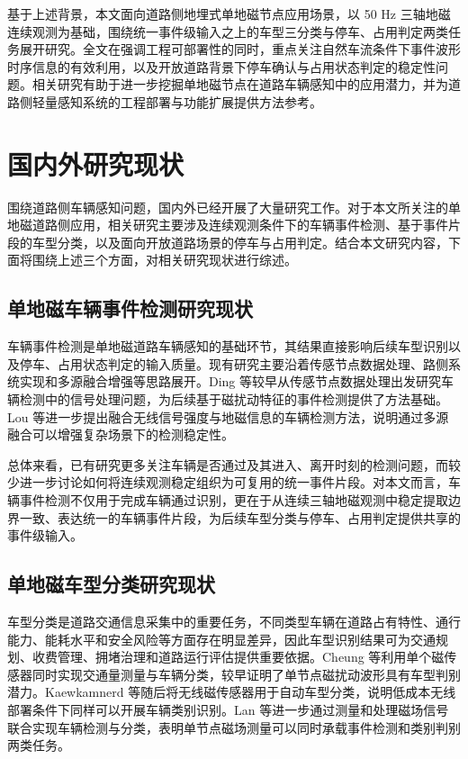 \documentclass{xdupgthesis}
\begin{document}
基于上述背景，本文面向道路侧地埋式单地磁节点应用场景，以 50 Hz 三轴地磁连续观测为基础，围绕统一事件级输入之上的车型三分类与停车、占用判定两类任务展开研究。全文在强调工程可部署性的同时，重点关注自然车流条件下事件波形时序信息的有效利用，以及开放道路背景下停车确认与占用状态判定的稳定性问题。相关研究有助于进一步挖掘单地磁节点在道路车辆感知中的应用潜力，并为道路侧轻量感知系统的工程部署与功能扩展提供方法参考。


\section{国内外研究现状}
\label{sec:related_work}

围绕道路侧车辆感知问题，国内外已经开展了大量研究工作。对于本文所关注的单地磁道路侧应用，相关研究主要涉及连续观测条件下的车辆事件检测、基于事件片段的车型分类，以及面向开放道路场景的停车与占用判定。结合本文研究内容，下面将围绕上述三个方面，对相关研究现状进行综述。

\subsection{单地磁车辆事件检测研究现状}
\label{sec:related_sensor_detection}

车辆事件检测是单地磁道路车辆感知的基础环节，其结果直接影响后续车型识别以及停车、占用状态判定的输入质量。现有研究主要沿着传感节点数据处理、路侧系统实现和多源融合增强等思路展开。Ding 等\cite{ch2_ding2004signal}较早从传感节点数据处理出发研究车辆检测中的信号处理问题，为后续基于磁扰动特征的事件检测提供了方法基础。Lou 等\cite{R13}进一步提出融合无线信号强度与地磁信息的车辆检测方法，说明通过多源融合可以增强复杂场景下的检测稳定性。

总体来看，已有研究更多关注车辆是否通过及其进入、离开时刻的检测问题，而较少进一步讨论如何将连续观测稳定组织为可复用的统一事件片段。对本文而言，车辆事件检测不仅用于完成车辆通过识别，更在于从连续三轴地磁观测中稳定提取边界一致、表达统一的车辆事件片段，为后续车型分类与停车、占用判定提供共享的事件级输入。

\subsection{单地磁车型分类研究现状}
\label{sec:related_vehicle_classification}

车型分类是道路交通信息采集中的重要任务，不同类型车辆在道路占有特性、通行能力、能耗水平和安全风险等方面存在明显差异，因此车型识别结果可为交通规划、收费管理、拥堵治理和道路运行评估提供重要依据。Cheung 等\cite{R17}利用单个磁传感器同时实现交通量测量与车辆分类，较早证明了单节点磁扰动波形具有车型判别潜力。Kaewkamnerd 等\cite{R21}随后将无线磁传感器用于自动车型分类，说明低成本无线部署条件下同样可以开展车辆类别识别。Lan 等\cite{R22}进一步通过测量和处理磁场信号联合实现车辆检测与分类，表明单节点磁场测量可以同时承载事件检测和类别判别两类任务。
\end{document}
